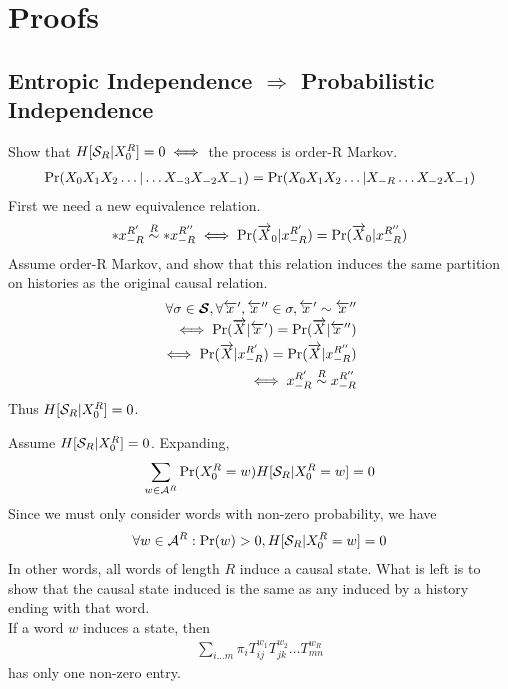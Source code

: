 \ifx\master\undefined\fi


\chapter{Proofs}
\label{app:proofs}

\section{Entropic Independence $\Rightarrow$ Probabilistic Independence}

Show that $H[\mathcal{S}_R | {X}_0^R] = 0 \iff$ the process is order-R Markov.
\begin{align*}
\Pr({X}_0 {X}_1 {X}_2 \ldots | \ldots {X}_{-3} {X}_{-2} {X}_{-1}) = 
\Pr({X}_0 {X}_1 {X}_2 \ldots | {X}_{-R} \ldots {X}_{-2} {X}_{-1})
\end{align*}
First we need a new equivalence relation.
\begin{align*}
\ast {x}_{-R}^{R'} \stackrel{R}{\sim} \ast {x}_{-R}^{R''} \iff \Pr(\smash{\overrightarrow{{X}}}_0 | {x}_{-R}^{R'}) = \Pr(\smash{\overrightarrow{{X}}}_0 | {x}_{-R}^{R''})
\end{align*}
Assume order-R Markov, and show that this relation induces the same partition on histories as the original causal relation.
\begin{align*}
\forall \sigma \in \boldsymbol{\mathcal{S}}, \forall \smash{\overleftarrow {{x}}}', \smash{\overleftarrow {{x}}}'' \in \sigma, \smash{\overleftarrow {{x}}}' \sim \smash{\overleftarrow {{x}}}''\\
\iff \Pr(\smash{\overrightarrow{{X}}} | \smash{\overleftarrow {{x}}}') = \Pr(\smash{\overrightarrow{{X}}} | \smash{\overleftarrow {{x}}}'')\\
\iff \Pr(\smash{\overrightarrow{{X}}} | {x}_{-R}^{R'}) = \Pr(\smash{\overrightarrow{{X}}} | {x}_{-R}^{R''})\\
\iff {x}_{-R}^{R'} \stackrel{R}{\sim} {x}_{-R}^{R''}
\end{align*}
Thus $H[\mathcal{S}_R | {X}_0^R] = 0$.

Assume $H[\mathcal{S}_R | {X}_0^R] = 0$.
Expanding,
\begin{align*}
\sum_{w \in \mathcal{A}^R}{\Pr({X}_0^R = w) H[\mathcal{S}_R | {X}_0^R = w]} = 0
\end{align*}
Since we must only consider words with non-zero probability, we have
\begin{align*}
\forall w \in \mathcal{A}^R : \Pr(w)>0, H[\mathcal{S}_R | {X}_0^R = w] = 0
\end{align*}
In other words, all words of length $R$ induce a causal state. What is left is to show that the causal state induced is the same as any induced by a history ending with that word.\\
If a word $w$ induces a state, then
\begin{align*}
\sum_{i \ldots m}\pi_i T_{ij}^{w_1} T_{jk}^{w_2} \ldots T_{mn}^{w_R}
\end{align*}
has only one non-zero entry.

